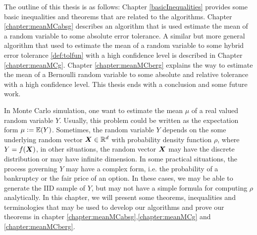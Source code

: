 \documentclass{iitthesis}
\theoremstyle{definition}
\begin{document}

The outline of this thesis is as follows: Chapter \ref{basicInequalities} provides some basic inequalities and theorems that are related to the algorithms. Chapter \ref{chapter:meanMCabsg} describes an algorithm that is used estimate the mean of a random variable to some absolute error tolerance. A similar but more general algorithm that used to estimate the mean of a random variable to some hybrid error tolerance \ref{def:tolfun} with a high confidence level is described in Chapter \ref{chapter:meanMCg}. Chapter \ref{chapter:meanMCberg} explains the way to estimate the mean of a Bernoulli random variable to some absolute and relative tolerance with a high confidence level. This thesis ends with a conclusion and some future work.

\label{basicInequalities}

In Monte Carlo simulation, one want to estimate the mean $\mu$ of a real valued random variable $Y$. Usually, this problem could be written as the expectation form $\mu:=\mathbb{E}(Y)$. Sometimes, the random variable $Y$ depends on the some underlying random vector $\boldsymbol{X} \in \mathbb{R}^d$ with probability density function $\rho$, where $Y = f(\boldsymbol{X})$, in other situations, the random vector $\boldsymbol{X}$ may have the discrete distribution or may have infinite dimension. In some practical situations, the process governing $Y$ may have a complex form, i.e. the probability of a bankruptcy or the fair price of an option. In these cases, we may be able to generate the IID sample of $Y$, but may not have a simple formula for computing $\rho$ analytically. 
In this chapter, we will present some theorems, inequalities and terminologies that may be used to develop our algorithms and prove our theorems in chapter \ref{chapter:meanMCabsg},\ref{chapter:meanMCg} and \ref{chapter:meanMCberg}.

\end{document}
